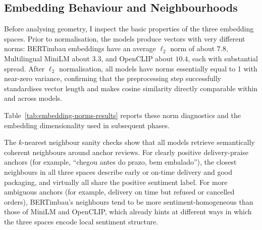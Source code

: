 \documentclass[a4paper,11pt]{article}
\begin{document}
\subsection{Embedding Behaviour and Neighbourhoods}

Before analysing geometry, I inspect the basic properties of the three embedding spaces. 
Prior to normalisation, the models produce vectors with very different norms: BERTimbau embeddings have an average $\ell_2$ norm of about $7.8$, Multilingual MiniLM about $3.3$, and OpenCLIP about $10.4$, each with substantial spread. 
After $\ell_2$ normalisation, all models have norms essentially equal to 1 with near-zero variance, confirming that the preprocessing step successfully standardises vector length and makes cosine similarity directly comparable within and across models.

Table~\ref{tab:embedding-norms-results} reports these norm diagnostics and the embedding dimensionality used in subsequent phases.

\begin{table}[tbp]
\centering
\small
\caption{Embedding norm diagnostics after extraction and $\ell_2$ normalisation.}
\label{tab:embedding-norms-results}
\end{table}

The $k$-nearest neighbour sanity checks show that all models retrieve semantically coherent neighbours around anchor reviews. 
For clearly positive delivery-praise anchors (for example, ``chegou antes do prazo, bem embalado''), the closest neighbours in all three spaces describe early or on-time delivery and good packaging, and virtually all share the positive sentiment label. 
For more ambiguous anchors (for example, delivery on time but refused or cancelled orders), BERTimbau’s neighbours tend to be more sentiment-homogeneous than those of MiniLM and OpenCLIP, which already hints at different ways in which the three spaces encode local sentiment structure.
\end{document}

